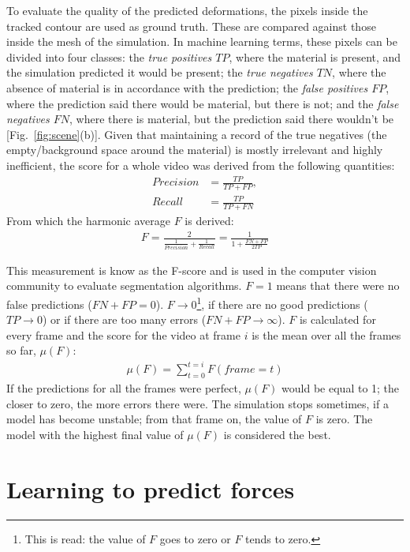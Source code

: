 \documentclass[journal]{IEEEtran}
\newcommand{\fref}[1]{Fig.~\ref{#1}}
\newcounter{algorithm}
\newcommand{\comment}[1]{{\color{red} #1}}
\begin{document}
To evaluate the quality of the predicted deformations, the pixels inside the tracked contour are used as ground truth.  These are  compared against those inside the mesh of the simulation.  In machine learning terms, these pixels can be divided into four classes: the \textit{true positives $TP$}, where the material is present, and the simulation predicted it would be present; the \textit{true negatives $TN$}, where the absence of material is in accordance with the prediction; the \textit{false positives $FP$}, where the prediction said there would be material, but there is not; and the \textit{false negatives $FN$}, where there is material, but the prediction said there wouldn't be [\fref{fig:scene}(b)].  Given that maintaining a record of the true negatives (the empty/background space around the material) is mostly irrelevant and highly inefficient, the score for a whole video was derived from the following quantities:
\begin{align}
 Precision &= \frac{TP}{TP+FP}, \\
 Recall &= \frac{TP}{TP+FN}
\end{align}
From which the harmonic average $F$ is derived:
\begin{align}
 F = \frac{2}{\frac{1}{Precision} + \frac{1}{Recall}} = \frac{1}{1 + \frac{FN + FP}{2TP}}
\end{align}

This measurement \comment{is know as the F-score and} is used in the computer vision community to evaluate segmentation algorithms.  $F=1$ means that there were no false predictions ($FN+FP = 0$).  $F \rightarrow 0$\footnote{This is read: the value of $F$ goes to zero or $F$ tends to zero.}, if there are no good predictions ($TP\rightarrow0$) or if there are too many errors ($FN+FP \rightarrow \infty$).  $F$ is calculated for every frame and the score for the video \comment{ at frame $i$} is the mean over all the frames so far, $\mu(F)$:
\comment{\begin{align}
 \mu(F) = \sum_{t=0}^{t=i} F(frame=t)
\end{align}}
If the predictions for all the frames were perfect, $\mu(F)$ would be equal to 1; the closer to zero, the more errors there were.  The simulation stops sometimes, if a model has become unstable; from that frame on, the value of $F$ is zero.  The model with the highest final value of $\mu(F)$ is considered the best.

\section{\comment{Learning to predict forces}}
\label{sec:forces}
\end{document}
